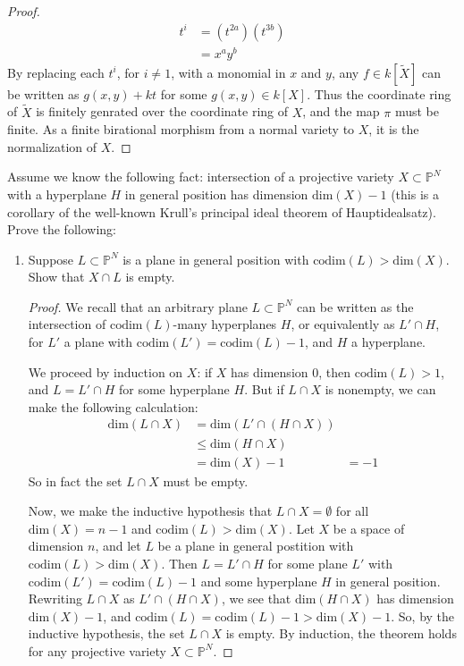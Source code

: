 \documentclass[12pt]{article}
\renewcommand{\P}{\mathbb{P}}
\theoremstyle{definition}
\newenvironment{problem}[2][Problem]{\begin{trivlist}
\item[\hskip \labelsep {\bfseries #1}\hskip \labelsep {\bfseries #2.}]}{\end{trivlist}}
\begin{document}
\begin{problem}{5}
\begin{enumerate}[label=(\alph*)]
\begin{proof}
					\begin{align*}
						t^i &= (t^{2a})(t^{3b})\\
						&= x^ay^b
					\end{align*}
					By replacing each $t^i$, for $i \neq 1$, with a monomial in $x$ and $y$, any $f \in k[\tilde X]$ can be written as $g(x,y) + kt$ for some $g(x,y) \in k[X]$. Thus the coordinate ring of $\tilde X$ is finitely genrated over the coordinate ring of $X$, and the map $\pi$ must be finite. As a finite birational morphism from a normal variety to $X$, it is the normalization of $X$.
				\end{proof}
	\end{enumerate}
\end{problem}
\begin{problem}{6}
	Assume we know the following fact: intersection of a projective variety $X \subset \P^N$ with a hyperplane $H$ in general position has dimension $\text{dim}(X) - 1$ (this is a corollary of the well-known Krull's principal ideal theorem of Hauptidealsatz). Prove the following:
	\begin{enumerate}[label=(\alph*)]
		\item Suppose $L \subset \P^N$ is a plane in general position with $\text{codim}(L) > \text{dim}(X)$. Show that $X \cap L$ is empty.
			\begin{proof}
				We recall that an arbitrary plane $L \subset \P^N$ can be written as the intersection of $\text{codim}(L)$-many hyperplanes $H$, or equivalently as $L' \cap H$, for $L'$ a plane with $\text{codim}(L') = \text{codim}(L) - 1$, and $H$ a hyperplane.
				\par We proceed by induction on $X$: if $X$ has dimension $0$, then $\text{codim}(L) > 1$, and $L = L' \cap H$ for some hyperplane $H$. But if $L \cap X$ is nonempty, we can make the following calculation:
				\begin{align*}
					\text{dim}(L \cap X) &= \text{dim}(L' \cap (H \cap X))\\
					&\leq \text{dim}(H \cap X)\\
					&= \text{dim}(X) - 1
					&= -1
				\end{align*}
				So in fact the set $L \cap X$ must be empty.
				\par Now, we make the inductive hypothesis that $L \cap X = \emptyset$ for all $\text{dim}(X) = n - 1$ and $\text{codim}(L) > \text{dim}(X)$. Let $X$ be a space of dimension $n$, and let $L$ be a plane in general postition with $\text{codim}(L) > \text{dim}(X)$. Then $L = L' \cap H$ for some plane $L'$ with $\text{codim}(L') = \text{codim}(L) - 1$ and some hyperplane $H$ in general position. Rewriting $L \cap X$ as $L' \cap (H \cap X)$, we see that $\text{dim}(H \cap X)$ has dimension $\text{dim}(X) - 1$, and $\text{codim}(L) = \text{codim}(L) - 1 > \text{dim}(X) - 1$. So, by the inductive hypothesis, the set $L \cap X$ is empty. By induction, the theorem holds for any projective variety $X \subset \P^N$.

\end{proof}
\end{enumerate}
\end{problem}
\end{document}
